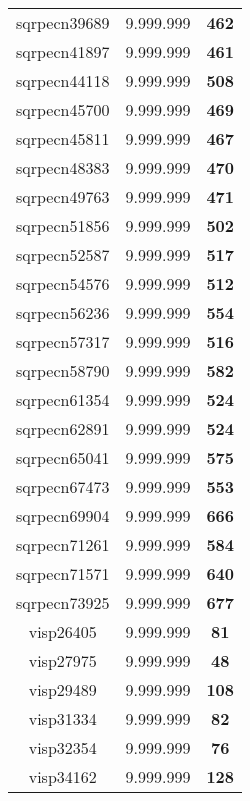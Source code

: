 \begin{tabular}{cc||c}
sqrpecn39689     & 9.999.999        & {\bf 462}       \\ 
sqrpecn41897     & 9.999.999        & {\bf 461}       \\ 
sqrpecn44118     & 9.999.999        & {\bf 508}       \\ 
sqrpecn45700     & 9.999.999        & {\bf 469}       \\ 
sqrpecn45811     & 9.999.999        & {\bf 467}       \\ 
sqrpecn48383     & 9.999.999        & {\bf 470}       \\ 
sqrpecn49763     & 9.999.999        & {\bf 471}       \\ 
sqrpecn51856     & 9.999.999        & {\bf 502}       \\ 
sqrpecn52587     & 9.999.999        & {\bf 517}       \\ 
sqrpecn54576     & 9.999.999        & {\bf 512}       \\ 
sqrpecn56236     & 9.999.999        & {\bf 554}       \\ 
sqrpecn57317     & 9.999.999        & {\bf 516}       \\ 
sqrpecn58790     & 9.999.999        & {\bf 582}       \\ 
sqrpecn61354     & 9.999.999        & {\bf 524}       \\ 
sqrpecn62891     & 9.999.999        & {\bf 524}       \\ 
sqrpecn65041     & 9.999.999        & {\bf 575}       \\ 
sqrpecn67473     & 9.999.999        & {\bf 553}       \\ 
sqrpecn69904     & 9.999.999        & {\bf 666}       \\ 
sqrpecn71261     & 9.999.999        & {\bf 584}       \\ 
sqrpecn71571     & 9.999.999        & {\bf 640}       \\ 
sqrpecn73925     & 9.999.999        & {\bf 677}       \\ 
visp26405        & 9.999.999        & {\bf 81}        \\ 
visp27975        & 9.999.999        & {\bf 48}        \\ 
visp29489        & 9.999.999        & {\bf 108}       \\ 
visp31334        & 9.999.999        & {\bf 82}        \\ 
visp32354        & 9.999.999        & {\bf 76}        \\ 
visp34162        & 9.999.999        & {\bf 128}       \\ 

\end{tabular}
